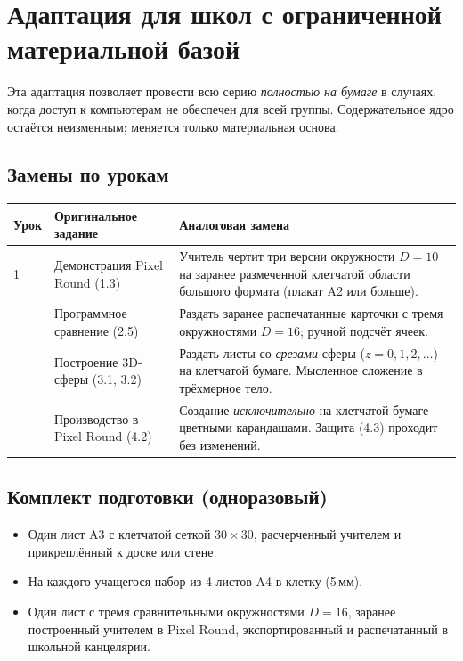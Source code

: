 \documentclass[12pt,a4paper]{scrartcl}
\begin{document}
\section{Адаптация для школ с ограниченной материальной базой}\label{ap:adapt}

Эта адаптация позволяет провести всю серию \emph{полностью на бумаге} в случаях, когда доступ к компьютерам не обеспечен для всей группы. Содержательное ядро остаётся неизменным; меняется только материальная основа.

\subsection{Замены по урокам}

\begin{center}
\small
\begin{tabularx}{\textwidth}{@{}p{}p{}X@{}}
\toprule
\textbf{Урок} & \textbf{Оригинальное задание} & \textbf{Аналоговая замена} \\
\midrule
1 & Демонстрация Pixel Round (1.3) & Учитель чертит три версии окружности $D = 10$ на заранее размеченной клетчатой области большого формата (плакат A2 или больше). \\
\addlinespace[3pt]
2 & Программное сравнение (2.5) & Раздать заранее распечатанные карточки с тремя окружностями $D = 16$; ручной подсчёт ячеек. \\
\addlinespace[3pt]
3 & Построение 3D-сферы (3.1, 3.2) & Раздать листы со \emph{срезами} сферы ($z = 0, 1, 2, \ldots$) на клетчатой бумаге. Мысленное сложение в трёхмерное тело. \\
\addlinespace[3pt]
4 & Производство в Pixel Round (4.2) & Создание \emph{исключительно} на клетчатой бумаге цветными карандашами. Защита (4.3) проходит без изменений. \\
\bottomrule
\end{tabularx}
\end{center}

\subsection{Комплект подготовки (одноразовый)}
\begin{itemize}[leftmargin=1.3em,itemsep=0.1em,topsep=0.2em,nosep]
  \item Один лист A3 с клетчатой сеткой $30 \times 30$, расчерченный учителем и прикреплённый к доске или стене.
  \item На каждого учащегося набор из 4 листов A4 в клетку (5\,мм).
  \item Один лист с тремя сравнительными окружностями $D = 16$, заранее построенный учителем в Pixel Round, экспортированный и распечатанный в школьной канцелярии.
\end{itemize}
\end{document}

